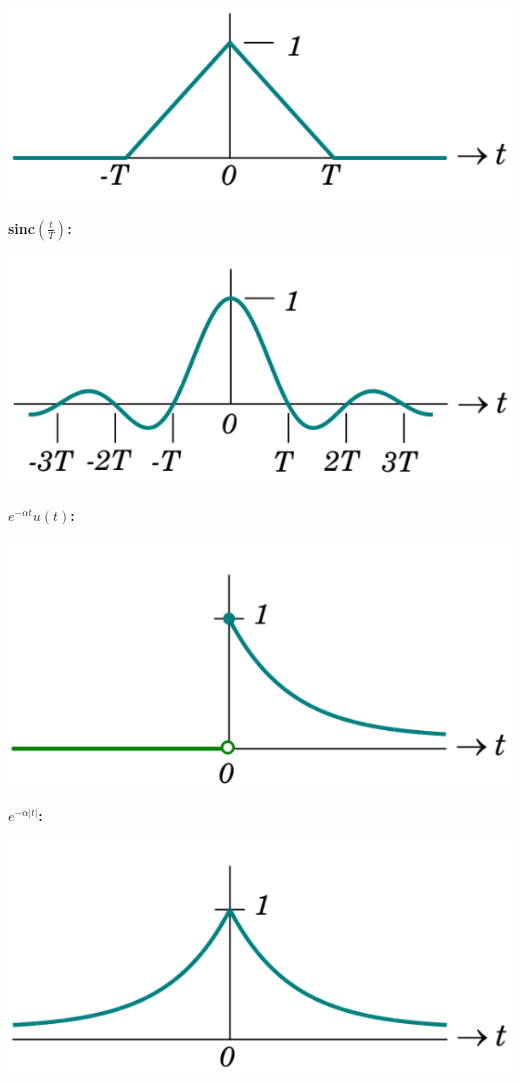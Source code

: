 \documentclass[landscape,a4paper]{extarticle}
\newenvironment{Figure}
  {\par\medskip\noindent\minipage{\linewidth}}
  {\endminipage\par\medskip}
\begin{document}
\begin{multicols*}{5}
    \begin{Figure}
        \centering
        \includegraphics[width=0.8\linewidth]{../images/tri.png}
    \end{Figure}
    \textbf{sinc$\left(\frac{t}{T}\right)$:}
    \begin{Figure}
        \centering
        \includegraphics[width=0.8\linewidth]{../images/sinc.png}
    \end{Figure}
    \textbf{$e^{-\alpha t}u(t)$: }
    \begin{Figure}
        \centering
        \includegraphics[width=0.8\linewidth]{../images/rightSidedDecayingExp.png}
    \end{Figure}
    \textbf{$e^{-\alpha |t|}$: }
    \begin{Figure}
        \centering
        \includegraphics[width=0.8\linewidth]{../images/twoSidedDecayingExp.png}

\end{Figure}
\end{multicols*}
\end{document}
